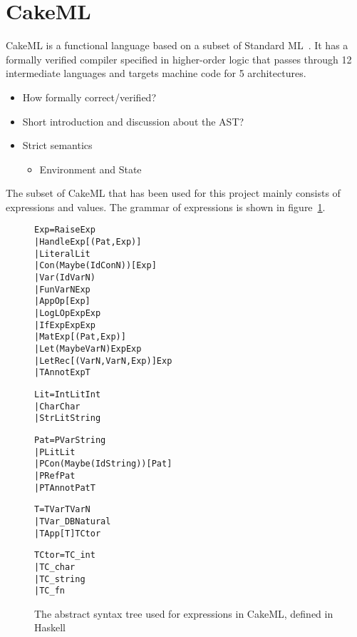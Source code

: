 \section{CakeML}

CakeML is a functional language based on a subset of
Standard ML~\cite{CakeML25:online}. It has a
formally verified compiler specified in higher-order logic that passes through
12 intermediate languages and targets machine code for 5 architectures.

\begin{itemize}
\item How formally correct/verified?
\item Short introduction and discussion about the AST?
\item Strict semantics
  \begin{itemize}
  \item Environment and State
  \end{itemize}
\end{itemize}


The subset of CakeML that has been used for this project mainly
consists of expressions and values.
The grammar of expressions is shown in figure~\ref{CakeAST}.

\vspace{\fboxsep}
\begin{figure}
\begin{alltt}
  Exp   = Raise Exp
        | Handle Exp [(Pat, Exp)]
        | Literal Lit
        | Con (Maybe (Id ConN)) [Exp]
        | Var (Id VarN)
        | Fun VarN Exp
        | App Op [Exp]
        | Log LOp Exp Exp
        | If Exp Exp Exp
        | Mat Exp [(Pat, Exp)]
        | Let (Maybe VarN) Exp Exp
        | LetRec [(VarN, VarN, Exp)] Exp
        | TAnnot Exp T
\end{alltt}
\begin{alltt}
  Lit   = IntLit Int
        | Char Char
        | StrLit String
\end{alltt}
\begin{alltt}
  Pat   = PVar String
        | PLit Lit
        | PCon (Maybe (Id String)) [Pat]
        | PRef Pat
        | PTAnnot Pat T
\end{alltt}
\begin{alltt}
  T     = TVar TVarN
        | TVar_DB Natural
        | TApp [T] TCtor
\end{alltt}
\begin{alltt}
  TCtor = TC_int
        | TC_char
        | TC_string
        | TC_fn
\end{alltt}
\caption[CakeAST]{The abstract syntax tree used for expressions in CakeML, defined in Haskell}
\label{CakeAST}
\end{figure}
\vspace{\fboxsep}
